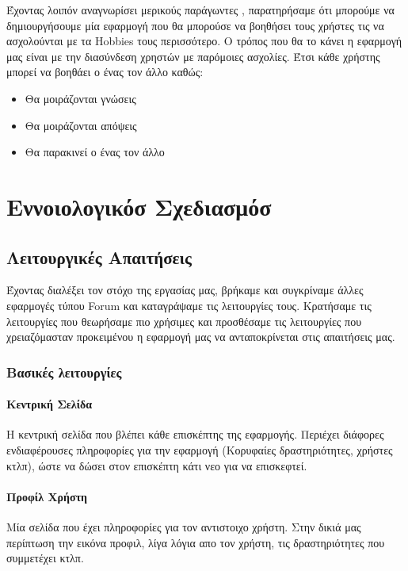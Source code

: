 \documentclass[nonacm, language=english, language=greek]{acmart}
\newcommand{\en}[1]{\textlatin{#1}}
\begin{document}
Έχοντας λοιπόν αναγνωρίσει μερικούς παράγωντες , παρατηρήσαμε ότι μπορούμε να δημιουργήσουμε μία εφαρμογή που θα μπορούσε να βοηθήσει τους χρήστες τις να ασχολούνται με τα \en{Hobbies} τους περισσότερο.
Ο τρόπος που θα το κάνει η εφαρμογή μας είναι με την διασύνδεση χρηστών με παρόμοιες ασχολίες.
Έτσι κάθε χρήστης μπορεί να βοηθάει ο ένας τον άλλο καθώς:
\begin{itemize}
    \item Θα μοιράζονται γνώσεις
    \item Θα μοιράζονται απόψεις
    \item Θα παρακινεί ο ένας τον άλλο
\end{itemize}

\section{Εννοιολογικόσ Σχεδιασμόσ}

\subsection{Λειτουργικές Απαιτήσεις}\label{sec:Features}

Έχοντας διαλέξει τον στόχο της εργασίας μας, βρήκαμε και συγκρίναμε άλλες εφαρμογές τύπου \en{Forum} και καταγράψαμε τις λειτουργίες τους.
Κρατήσαμε τις λειτουργίες που θεωρήσαμε πιο χρήσιμες και προσθέσαμε τις λειτουργίες που χρειαζόμασταν προκειμένου η εφαρμογή μας να ανταποκρίνεται στις απαιτήσεις μας.

\subsubsection{Βασικές λειτουργίες}

\paragraph{Κεντρική Σελίδα} 
Η κεντρική σελίδα που βλέπει κάθε επισκέπτης της εφαρμογής. Περιέχει διάφορες
ενδιαφέρουσες πληροφορίες για την εφαρμογή (Κορυφαίες δραστηριότητες, χρήστες
κτλπ), ώστε να δώσει στον επισκέπτη κάτι νεο για να επισκεφτεί.
 
\paragraph{Προφίλ Χρήστη}
Μία σελίδα που έχει πληροφορίες για τον αντιστοιχο χρήστη. Στην δικιά μας περίπτωση την εικόνα προφιλ, λίγα λόγια απο τον χρήστη, τις δραστηριότητες που συμμετέχει κτλπ.
 
\end{document}
